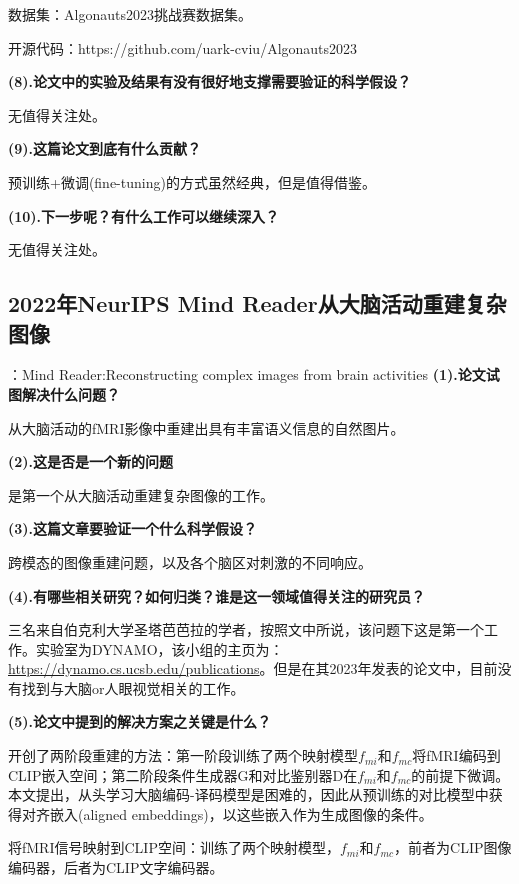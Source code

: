 \documentclass[12pt, a4paper, oneside]{ctexart}
\begin{document}
    数据集：Algonauts2023挑战赛数据集。

    开源代码：https://github.com/uark-cviu/Algonauts2023

    \noindent\textbf{(8).论文中的实验及结果有没有很好地支撑需要验证的科学假设？}

    无值得关注处。

    \noindent\textbf{(9).这篇论文到底有什么贡献？}

    预训练+微调(fine-tuning)的方式虽然经典，但是值得借鉴。

    \noindent\textbf{(10).下一步呢？有什么工作可以继续深入？}

    无值得关注处。

    \subsection{2022年NeurIPS Mind Reader从大脑活动重建复杂图像\cite{NEURIPS2022_bee5125b}}
    ：{Mind Reader:Reconstructing complex images from brain activities}
    \noindent\textbf{(1).论文试图解决什么问题？}

    从大脑活动的fMRI影像中重建出具有丰富语义信息的自然图片。

    \noindent\textbf{(2).这是否是一个新的问题}

    是第一个从大脑活动重建复杂图像的工作。

    \noindent\textbf{(3).这篇文章要验证一个什么科学假设？}

    跨模态的图像重建问题，以及各个脑区对刺激的不同响应。

    \noindent\textbf{(4).有哪些相关研究？如何归类？谁是这一领域值得关注的研究员？}

    三名来自伯克利大学圣塔芭芭拉的学者，按照文中所说，该问题下这是第一个工作。实验室为DYNAMO，该小组的主页为：\url{https://dynamo.cs.ucsb.edu/publications}。但是在其2023年发表的论文中，目前没有找到与大脑or人眼视觉相关的工作。

    \noindent\textbf{(5).论文中提到的解决方案之关键是什么？}

    开创了两阶段重建的方法：第一阶段训练了两个映射模型$f_{mi}$和$f_{mc}$将fMRI编码到CLIP嵌入空间；第二阶段条件生成器G和对比鉴别器D在$f_{mi}$和$f_{mc}$的前提下微调。本文提出，从头学习大脑编码-译码模型是困难的，因此从预训练的对比模型中获得对齐嵌入(aligned embeddings)，以这些嵌入作为生成图像的条件。

    将fMRI信号映射到CLIP空间：训练了两个映射模型，$f_{mi}$和$f_{mc}$，前者为CLIP图像编码器，后者为CLIP文字编码器。
\end{document}
